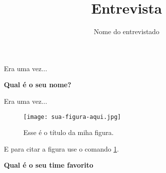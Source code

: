%
% 
%
%

\title{Entrevista}
\subtitle{Nome do entrevistado}
\maketitle



Era uma vez...



\textbf{Qual é o seu nome?}



Era uma vez...



\begin{figure}[htbp]
   \centering
   \texttt{[image: sua-figura-aqui.jpg]}

   \caption{Esse é o título da miha figura.}

   \label{fig:rótulo-da-figura}
\end{figure}



E para citar a figura use o comando \ref{fig:rótulo-da-figura}.



\textbf{Qual é o seu time favorito}



